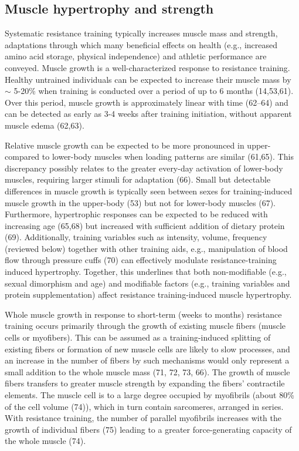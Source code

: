 \documentclass[twoside,10pt]{gihclass} %
\begin{document}
\hypertarget{muscle-hypertrophy-and-strength}{%
\subsection{Muscle hypertrophy and strength}\label{muscle-hypertrophy-and-strength}}

Systematic resistance training typically increases muscle mass and strength, adaptations through which many beneficial effects on health (e.g., increased amino acid storage, physical independence) and athletic performance are conveyed.
Muscle growth is a well-characterized response to resistance training.
Healthy untrained individuals can be expected to increase their muscle mass by \(\sim\) 5-20\% when training is conducted over a period of up to 6 months
(14,53,61).
Over this period, muscle growth is approximately linear with time
(62--64)
and can be detected as early as 3-4 weeks after training initiation, without apparent muscle edema
(62,63).

Relative muscle growth can be expected to be more pronounced in upper- compared to lower-body muscles when loading patterns are similar
(61,65).
This discrepancy possibly relates to the greater every-day activation of lower-body muscles, requiring larger stimuli for adaptation
(66).
Small but detectable differences in muscle growth is typically seen between sexes for training-induced muscle growth in the upper-body
(53)
but not for lower-body muscles
(67).
Furthermore, hypertrophic responses can be expected to be reduced with increasing age
(65,68)
but increased with sufficient addition of dietary protein
(69).
Additionally, training variables such as intensity, volume, frequency (reviewed below) together with other training aids, e.g., manipulation of blood flow through pressure cuffs
(70)
can effectively modulate resistance-training induced hypertrophy.
Together, this underlines that both non-modifiable (e.g., sexual dimorphism and age) and modifiable factors (e.g., training variables and protein supplementation) affect resistance training-induced muscle hypertrophy.

Whole muscle growth in response to short-term (weeks to months) resistance training occurs primarily through the growth of existing muscle fibers (muscle cells or myofibers).
This can be assumed as a training-induced splitting of existing fibers or formation of new muscle cells are likely to slow processes, and an increase in the number of fibers by such mechanisms would only represent a small addition to the whole muscle mass
(71, 72, 73, 66).
The growth of muscle fibers transfers to greater muscle strength by expanding the fibers' contractile elements.
The muscle cell is to a large degree occupied by myofibrils
(about 80\% of the cell volume
(74)),
which in turn contain sarcomeres, arranged in series.
With resistance training, the number of parallel myofibrils increases with the growth of individual fibers
(75)
leading to a greater force-generating capacity of the whole muscle
(74).
\end{document}
